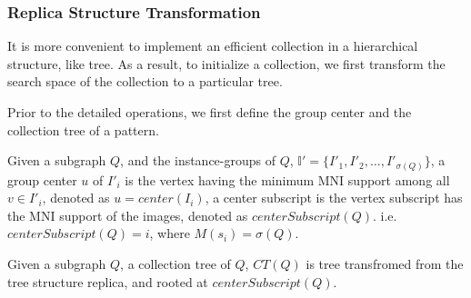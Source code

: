 \subsubsection{Replica Structure Transformation}
It is more convenient to implement an efficient collection in a hierarchical structure, like tree. As a result, to initialize a collection, we first transform the search space of the collection to a particular tree.
\par Prior to the detailed operations, we first define the group center and the collection tree of a pattern.
\begin{defn}
	Given a subgraph $Q$, and the instance-groups of $Q$, $\mathbb{I'}=\{I'_1,I'_2,\ldots,I'_{\sigma(Q)}\}$, a group center $u$ of $I'_i$ is the vertex having the minimum MNI support among all $v\in I'_i$, denoted as $u=center(I_i)$, a center subscript is the vertex subscript has the MNI support of the images, denoted as $centerSubscript(Q)$. i.e. $centerSubscript(Q)=i$, where $M(s_i)=\sigma(Q)$.
\end{defn}
\begin{defn}
	Given a subgraph $Q$, a collection tree of $Q$, $CT(Q)$ is tree transfromed from the tree structure replica, and rooted at $centerSubscript(Q)$.
\end{defn}
